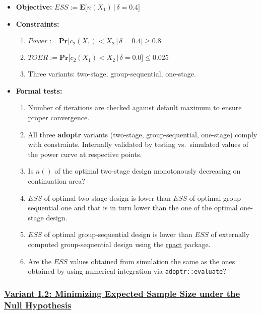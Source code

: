 \documentclass[
]{book}
\providecommand{\tightlist}{%
  \setlength{\itemsep}{0pt}\setlength{\parskip}{0pt}}
\begin{document}
\begin{itemize}
\tightlist
\item
  \textbf{Objective:} \(ESS := \boldsymbol{E}\big[n(X_1)\,|\,\delta=0.4\big]\)
\item
  \textbf{Constraints:}

  \begin{enumerate}
  \def\labelenumi{\arabic{enumi}.}
  \tightlist
  \item
    \(Power := \boldsymbol{Pr}\big[c_2(X_1) < X_2\,|\,\delta=0.4\big] \geq 0.8\)
  \item
    \(TOER := \boldsymbol{Pr}\big[c_2(X_1) < X_2\,|\,\delta=0.0\big] \leq 0.025\)
  \item
    Three variants: two-stage, group-sequential, one-stage.
  \end{enumerate}
\item
  \textbf{Formal tests:}

  \begin{enumerate}
  \def\labelenumi{\arabic{enumi}.}
  \tightlist
  \item
    Number of iterations are checked against default maximum to ensure proper
    convergence.
  \item
    All three \textbf{adoptr} variants (two-stage, group-sequential, one-stage)
    comply with constraints. Internally validated by testing vs.~simulated
    values of the power curve at respective points.
  \item
    Is \(n()\) of the optimal two-stage design monotonously decreasing on
    continuation area?
  \item
    \(ESS\) of optimal two-stage design is lower than \(ESS\) of optimal
    group-sequential one and that is in turn lower than the one of the
    optimal one-stage design.
  \item
    \(ESS\) of optimal group-sequential design is lower than \(ESS\) of
    externally computed group-sequential design using the \href{https://rpact.org/}{rpact} package.
  \item
    Are the \(ESS\) values obtained from simulation the same as the ones
    obtained by using numerical integration via \texttt{adoptr::evaluate}?
  \end{enumerate}
\end{itemize}

\hypertarget{variant-i.2-minimizing-expected-sample-size-under-the-null-hypothesis}{%
\subsubsection{\texorpdfstring{\protect\hyperlink{variantI_2}{Variant I.2: Minimizing Expected Sample Size under the Null Hypothesis}}{Variant I.2: Minimizing Expected Sample Size under the Null Hypothesis}}\label{variant-i.2-minimizing-expected-sample-size-under-the-null-hypothesis}}
\end{document}
